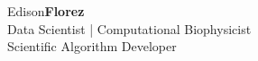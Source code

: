 
\begin{center}
    {\fontsize{60}{40}\selectfont Edison\bf Florez} \\
    \Large{
        Data Scientist | Computational Biophysicist \\
        Scientific Algorithm Developer
    }
\end{center}

